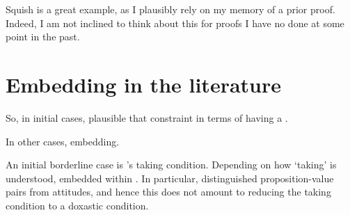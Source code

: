 \begin{note}
  Squish is a great example, as I plausibly rely on my memory of a prior proof.
  Indeed, I am not inclined to think about this for proofs I have no done at some point in the past.

  
\end{note}

\section{Embedding in the literature}
\label{cha:var:sec:embedding}

\begin{note}
  So, in initial cases, plausible that constraint in terms of having a \wit{}.

  In other cases, embedding.
\end{note}

\begin{note}
  An initial borderline case is \citeauthor{Boghossian:2014aa}'s taking condition.
  Depending on how `taking' is understood, embedded within \ros{}.
  In particular, distinguished proposition-value pairs from attitudes, and hence this does not amount to reducing the taking condition to a doxastic condition.
\end{note}

\subsection*{\textcite{Thomson:1965vv}}

